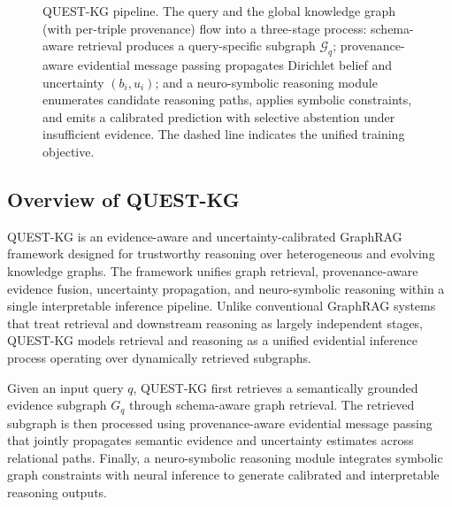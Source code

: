 \documentclass[sigconf,review,anonymous]{acmart}
\begin{document}
\begin{figure}[t]
{%
}
\caption{QUEST-KG pipeline. The query and the global knowledge graph (with per-triple provenance) flow into a three-stage process: schema-aware retrieval produces a query-specific subgraph $\mathcal{G}_q$; provenance-aware evidential message passing propagates Dirichlet belief and uncertainty $(b_i, u_i)$; and a neuro-symbolic reasoning module enumerates candidate reasoning paths, applies symbolic constraints, and emits a calibrated prediction with selective abstention under insufficient evidence. The dashed line indicates the unified training objective.}
\label{fig:architecture}
\end{figure}

\subsection{Overview of QUEST-KG}

QUEST-KG is an evidence-aware and uncertainty-calibrated GraphRAG framework designed for trustworthy reasoning over heterogeneous and evolving knowledge graphs. The framework unifies graph retrieval, provenance-aware evidence fusion, uncertainty propagation, and neuro-symbolic reasoning within a single interpretable inference pipeline. Unlike conventional GraphRAG systems that treat retrieval and downstream reasoning as largely independent stages, QUEST-KG models retrieval and reasoning as a unified evidential inference process operating over dynamically retrieved subgraphs.

Given an input query $q$, QUEST-KG first retrieves a semantically grounded evidence subgraph $G_q$ through schema-aware graph retrieval. The retrieved subgraph is then processed using provenance-aware evidential message passing that jointly propagates semantic evidence and uncertainty estimates across relational paths. Finally, a neuro-symbolic reasoning module integrates symbolic graph constraints with neural inference to generate calibrated and interpretable reasoning outputs.
\end{document}
